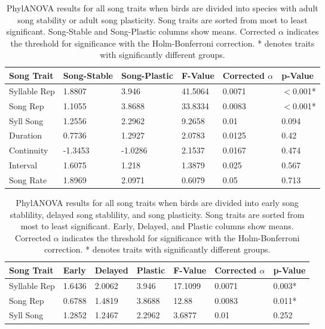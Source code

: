 \documentclass[a4paper,12pt]{article}
\begin{document}
    
\begin{table}[ht]
\caption{PhylANOVA results for all song traits when birds are divided into species with adult song stability or adult song plasticity.  Song traits are sorted from most to least significant.  Song-Stable and Song-Plastic columns show means.  Corrected $\alpha$ indicates the threshold for significance with the Holm-Bonferroni correction. * denotes traits with significantly different groups.}
\centering
\begin{tabular}{llllll}
  \hline
Song Trait & Song-Stable & Song-Plastic & F-Value & Corrected $\alpha$ & p-Value \\ 
  \hline
Syllable Rep & 1.8807 & 3.946 & 41.5064 & 0.0071 &$<$0.001* \\ 
  Song Rep & 1.1055 & 3.8688 & 33.8334 & 0.0083 &$<$0.001* \\ 
  Syll Song & 1.2556 & 2.2962 & 9.2658 & 0.01 & 0.094 \\ 
  Duration & 0.7736 & 1.2927 & 2.0783 & 0.0125 & 0.42 \\ 
  Continuity & -1.3453 & -1.0286 & 2.1537 & 0.0167 & 0.474 \\ 
  Interval & 1.6075 & 1.218 & 1.3879 & 0.025 & 0.567 \\ 
  Song Rate & 1.8969 & 2.0971 & 0.6079 & 0.05 & 0.713 \\ 
   \hline
\end{tabular}
\end{table}



\begin{table}[ht]
\caption{PhylANOVA results for all song traits when birds are divided into early song stablility, delayed song stablility, and song plasticity.  Song traits are sorted from most to least significant.  Early, Delayed, and Plastic columns show means.  Corrected $\alpha$ indicates the threshold for significance with the Holm-Bonferroni correction.  * denotes traits with significantly different groups.}
\centering
\begin{tabular}{lllllll}
  \hline
Song Trait & Early & Delayed & Plastic & F-Value & Corrected $\alpha$ & p-Value \\ 
  \hline
Syllable Rep & 1.6436 & 2.0062 & 3.946 & 17.1099 & 0.0071 & 0.003* \\ 
  Song Rep & 0.6788 & 1.4819 & 3.8688 & 12.88 & 0.0083 & 0.011* \\ 
  Syll Song & 1.2852 & 1.2467 & 2.2962 & 3.6877 & 0.01 & 0.252 \\ 
   \hline
\end{tabular}
\end{table}
\end{document}
